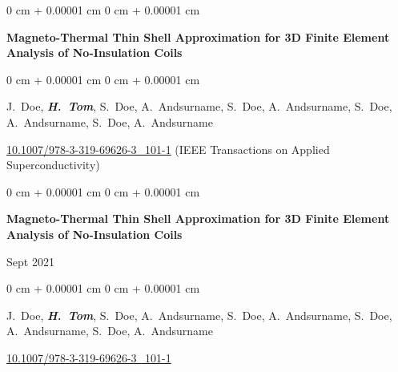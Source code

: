 \documentclass[10pt, letterpaper]{article}
\newenvironment{onecolentry}{
    \begin{adjustwidth}{
        0 cm + 0.00001 cm
    }{
        0 cm + 0.00001 cm
    }
}{
    \end{adjustwidth}
} %
\newenvironment{twocolentry}[2][]{
    \onecolentry
    \def\secondColumn{#2}
    \setcolumnwidth{\fill, 4.5 cm}
    \begin{paracol}{2}
}{
    \switchcolumn \raggedleft \secondColumn
    \end{paracol}
    \endonecolentry
} %
\begin{document}
        \begin{samepage}
            \begin{onecolentry}
                \textbf{Magneto-Thermal Thin Shell Approximation for 3D Finite Element Analysis of No-Insulation Coils}
            \end{onecolentry}

            \vspace{0.10 cm}
            
            \begin{onecolentry}
                \mbox{J. Doe}, \mbox{\textbf{\textit{H. Tom}}}, \mbox{S. Doe}, \mbox{A. Andsurname}, \mbox{S. Doe}, \mbox{A. Andsurname}, \mbox{S. Doe}, \mbox{A. Andsurname}, \mbox{S. Doe}, \mbox{A. Andsurname}

                \vspace{0.10 cm}
                
        \href{https://doi.org/10.1007/978-3-319-69626-3_101-1}{10.1007/978-3-319-69626-3\_101-1}
         (IEEE Transactions on Applied Superconductivity)\end{onecolentry}
        \end{samepage}

        \vspace{0.2 cm}

        \begin{samepage}
            \begin{twocolentry}{
                Sept 2021
            }
                \textbf{Magneto-Thermal Thin Shell Approximation for 3D Finite Element Analysis of No-Insulation Coils}
            \end{twocolentry}

            \vspace{0.10 cm}
            
            \begin{onecolentry}
                \mbox{J. Doe}, \mbox{\textbf{\textit{H. Tom}}}, \mbox{S. Doe}, \mbox{A. Andsurname}, \mbox{S. Doe}, \mbox{A. Andsurname}, \mbox{S. Doe}, \mbox{A. Andsurname}, \mbox{S. Doe}, \mbox{A. Andsurname}

                \vspace{0.10 cm}
                
        \href{https://doi.org/10.1007/978-3-319-69626-3_101-1}{10.1007/978-3-319-69626-3\_101-1}
        \end{onecolentry}
        \end{samepage}
\end{document}
